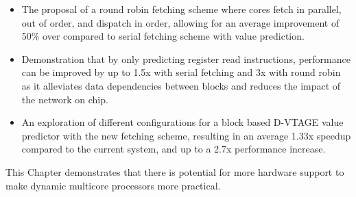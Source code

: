 \begin{itemize}
\item The proposal of a round robin fetching scheme where cores fetch in parallel, out of order, and dispatch in order, allowing for an average improvement of 50\% over compared to serial fetching scheme with value prediction.
\vspace{-0.5em}
\item Demonstration that by only predicting register read instructions, performance can be improved by up to 1.5x with serial fetching and 3x with round robin as it alleviates data dependencies between blocks and reduces the impact of the network on chip.
\vspace{-0.5em}
\item An exploration of different configurations for a block based D-VTAGE value predictor with the new fetching scheme, resulting in an average 1.33x speedup compared to the current system, and up to a 2.7x performance increase.
\end{itemize}

This Chapter demonstrates that there is potential for more hardware support to make dynamic multicore processors more practical.
